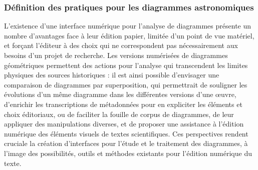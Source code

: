    \subsubsection{Définition des pratiques pour les diagrammes astronomiques}
    L'existence d'une interface numérique pour l'analyse de diagrammes présente un nombre d'avantages face à leur édition papier, limitée d'un point de vue matériel, et forçant l'éditeur à des choix qui ne correspondent pas nécessairement aux besoins d'un projet de recherche. Les versions numérisées de diagrammes géométriques permettent des actions pour l'analyse qui transcendent les limites physiques des sources historiques : il est ainsi possible d'envisager une comparaison de diagrammes par superposition, qui permettrait de souligner les évolutions d'un même diagramme dans les différentes versions d'une œuvre, d'enrichir les transcriptions de métadonnées pour en expliciter les éléments et choix éditoriaux, ou de faciliter la fouille de corpus de diagrammes, de leur appliquer des manipulations diverses, et de proposer une assistance à l'édition numérique des éléments visuels de textes scientifiques. Ces perspectives rendent cruciale la création d'interfaces pour l'étude et le traitement des diagrammes, à l'image des possibilités, outils et méthodes existants pour l'édition numérique du texte.
    
